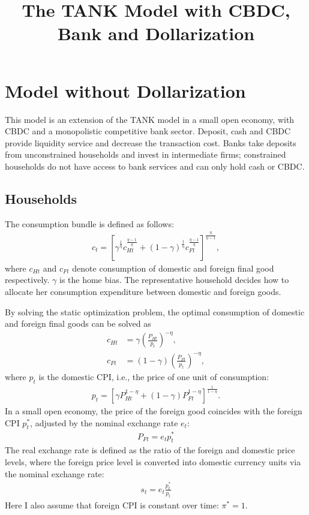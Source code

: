 \documentclass[12pt]{article}
\begin{document}
\title{\large \textbf{The TANK Model with CBDC, Bank and Dollarization}}
\date{}
\maketitle
\section{Model without Dollarization}
This model is an extension of the TANK model in a small open economy, with CBDC and a monopolistic competitive bank sector. Deposit, cash and CBDC provide liquidity service and decrease the transaction cost. Banks take deposits from unconstrained households and invest in intermediate firms; constrained households do not have access to bank services and can only hold cash or CBDC. 

\subsection{Households}
The consumption bundle is defined as follows:
\begin{align*}
c_t = [\gamma^{\frac{1}{\eta}}c_{Ht}^{\frac{\eta-1}{\eta}}+(1-\gamma)^{\frac{1}{\eta}}c_{Ft}^{\frac{\eta-1}{\eta}}]^{\frac{\eta}{\eta-1}}, 
\end{align*}
where $c_{Ht}$ and $c_{Ft}$ denote consumption of domestic and foreign final good respectively. $\gamma$ is the home bias. The representative household decides how to allocate her consumption expenditure between domestic and foreign goods.

By solving the static optimization problem, the optimal consumption of domestic and foreign final goods can be solved as 
\begin{align*}
c_{Ht} &= \gamma(\frac{P_{Ht}}{p_t})^{-\eta}, \\
c_{Ft} &= (1-\gamma)(\frac{P_{Ft}}{p_t})^{-\eta}, 
\end{align*}
where $p_t$ is the domestic CPI, i.e., the price of one unit of consumption: 
\begin{align*}
p_t = [\gamma P_{Ht}^{1-\eta}+(1-\gamma)P_{Ft}^{1-\eta}]^{\frac{1}{1-\eta}}.
\end{align*}
In a small open economy, the price of the foreign good coincides with the foreign CPI $p_t^*$, adjusted by the nominal exchange rate $e_t$:
\begin{align*}
P_{Ft} = e_tp_t^*
\end{align*}
The real exchange rate is defined as the ratio of the foreign and domestic price levels, where the foreign price level is converted into domestic currency units via the nominal exchange rate: 
\begin{align*}
s_t = e_t \frac{p_t^*}{p_t}
\end{align*}
Here I also assume that foreign CPI is constant over time: $\pi^* = 1$.
\end{document}
